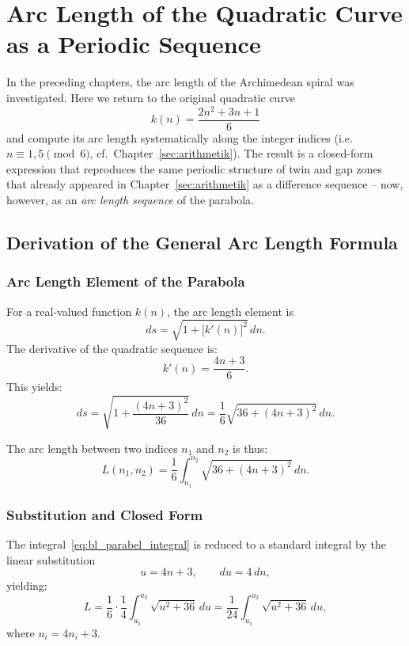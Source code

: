 \chapter{Arc Length of the Quadratic Curve as a Periodic Sequence}
\label{sec:bogenlaenge_parabel}

In the preceding chapters, the arc length of the Archimedean
spiral was investigated. Here we return to the original quadratic curve
\[
  k(n) = \frac{2n^2 + 3n + 1}{6}
\]
and compute its arc length systematically along the integer
indices (i.e.\ $n \equiv 1, 5 \pmod{6}$, cf.\ Chapter~\ref{sec:arithmetik}).
The result is a closed-form
expression that reproduces the same periodic structure of twin and gap zones
that already appeared in Chapter~\ref{sec:arithmetik} as a difference sequence --
now, however, as an \emph{arc length sequence} of the parabola.

\section{Derivation of the General Arc Length Formula}
\label{sec:bl_herleitung}

\subsection{Arc Length Element of the Parabola}

For a real-valued function $k(n)$, the arc length element is
\[
  ds = \sqrt{1 + \bigl[k'(n)\bigr]^2}\,dn.
\]
The derivative of the quadratic sequence is:
\[
  k'(n) = \frac{4n+3}{6}.
\]
This yields:
\[
  ds = \sqrt{1 + \frac{(4n+3)^2}{36}}\,dn
     = \frac{1}{6}\sqrt{36 + (4n+3)^2}\,dn.
\]

The arc length between two indices $n_1$ and $n_2$ is thus:
\begin{equation}\label{eq:bl_parabel_integral}
  L(n_1, n_2)
  = \frac{1}{6}\int_{n_1}^{n_2} \sqrt{36 + (4n+3)^2}\,dn.
\end{equation}

\subsection{Substitution and Closed Form}

The integral~\eqref{eq:bl_parabel_integral} is reduced to a standard integral
by the linear substitution
\[
  u = 4n + 3, \qquad du = 4\,dn,
\]
yielding:
\[
  L = \frac{1}{6} \cdot \frac{1}{4}
      \int_{u_1}^{u_2} \sqrt{u^2 + 36}\,du
  = \frac{1}{24}\int_{u_1}^{u_2} \sqrt{u^2 + 36}\,du,
\]
where $u_i = 4n_i + 3$.

